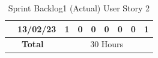 \documentclass[12pt]{report}
\begin{document}
\begin{table}[h]
{\begin{tabular}{|cc|ccccccc|}
\rowcolor[HTML]{FFFFFF} 
\multicolumn{1}{|c|}{\cellcolor[HTML]{FFFFFF}\textbf{Testing}}                                                   & 13/02/23                                                           & \multicolumn{1}{c|}{\cellcolor[HTML]{FFFFFF}1}                                                                    & \multicolumn{1}{c|}{\cellcolor[HTML]{FFFFFF}0}                                                                 & \multicolumn{1}{c|}{\cellcolor[HTML]{FFFFFF}0}                                                                 & \multicolumn{1}{c|}{\cellcolor[HTML]{FFFFFF}0}                                                                  & \multicolumn{1}{c|}{\cellcolor[HTML]{FFFFFF}0}                                                                  & \multicolumn{1}{c|}{\cellcolor[HTML]{FFFFFF}0}                                                                  & \cellcolor[HTML]{FFFFFF}1                                          \\ \hline
\multicolumn{2}{|c|}{\textbf{Total}}                                                                                                                                                  & \multicolumn{7}{c|}{30   Hours}                                                                                                                                                                                                                                                                                                                                                                                                                                                                                                                                                                                                                                                                                                                                                \\ \hline
\end{tabular}
}
\caption{Sprint Backlog1 (Actual) User Story 2}
\label{tab:mytable}
\end{table}
\end{document}
